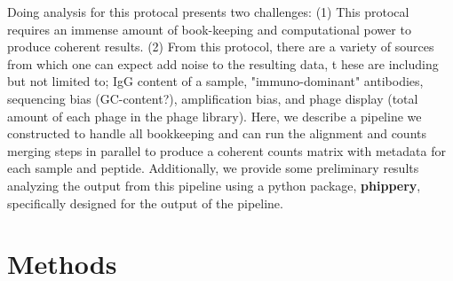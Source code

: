 \documentclass{article}
\begin{document}
Doing analysis for this protocal presents two challenges:
(1) This protocal requires an immense amount of book-keeping and computational power to produce coherent results.
(2) From this protocol, there are a variety of sources from which one can expect add noise to the resulting data, t
hese are including but not limited to; 
IgG content of a sample, "immuno-dominant" antibodies, sequencing bias (GC-content?), amplification bias, and phage display (total amount of each phage in the phage library). 
Here, we describe a pipeline we constructed to handle all bookkeeping and can run the alignment and counts merging steps in parallel to produce a coherent counts matrix with metadata for each sample and peptide.
Additionally, we provide some preliminary results analyzing the output from this pipeline using a python package, \textbf{phippery}, specifically designed for the output of the pipeline.

\section*{Methods}
\end{document}
